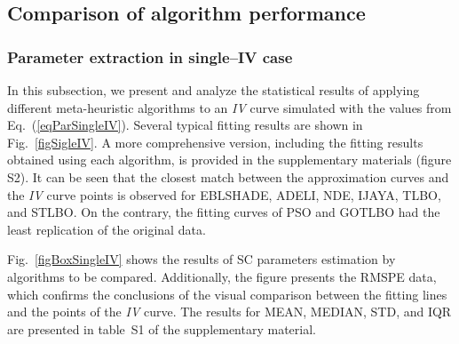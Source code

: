 \documentclass[a4paper,fleqn]{cas-sc}
\begin{document}
\subsection{Comparison of algorithm performance}

\subsubsection{Parameter extraction in single--IV case}
In this subsection, we present and analyze the statistical results of
applying different meta-heuristic algorithms to an \emph{IV} curve simulated with the values from Eq.~(\ref{eqParSingleIV}).
Several typical fitting results are shown in Fig.~\ref{figSigleIV}.
A more comprehensive version, including the fitting results obtained using each algorithm,
is provided in the supplementary materials (figure S2).
It can be seen that the closest match between the approximation curves and the \emph{IV} curve points is
observed for EBLSHADE, ADELI, NDE, IJAYA, TLBO, and STLBO.
On the contrary, the fitting curves of PSO and GOTLBO had the least replication of the original data.

Fig.~\ref{figBoxSingleIV} shows the results of SC parameters estimation by algorithms to be compared.
Additionally, the figure presents the RMSPE data,
which confirms the conclusions of the visual comparison between the fitting lines and the points of the \emph{IV} curve.
The results for MEAN, MEDIAN, STD, and IQR are presented in table~S1 of the supplementary material.
\end{document}
